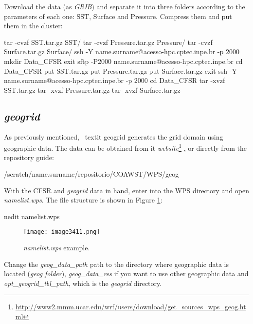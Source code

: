 \noindent Download the data (as \textit{GRIB}) and separate it into three folders according to the parameters of each one:
SST, Surface and Pressure. Compress them and put them in the cluster:
\bigskip

\begin{bashcode}
tar -cvzf SST.tar.gz SST/
tar -cvzf Pressure.tar.gz Pressure/
tar -cvzf Surface.tar.gz Surface/
ssh -Y name.surname@acesso-hpc.cptec.inpe.br -p 2000
mkdir Data_CFSR
exit
sftp -P2000 name.surname@acesso-hpc.cptec.inpe.br
cd Data_CFSR
put SST.tar.gz
put Pressure.tar.gz
put Surface.tar.gz
exit
ssh -Y name.surname@acesso-hpc.cptec.inpe.br -p 2000
cd Data_CFSR
tar -xvzf SST.tar.gz
tar -xvzf Pressure.tar.gz
tar -xvzf Surface.tar.gz
\end{bashcode}
\bigskip

\subsection{\textit{geogrid}}\label{geowps}
\bigskip

\noindent As previously mentioned, \ textit {geogrid} generates the grid domain using geographic data. The data can be obtained from it 
\textcolor{bleu_cite}{\textit{website}\footnote{\textcolor{bleu_cite}{\href{http://www2.mmm.ucar.edu/wrf/users/download/get\_sources\_wps\_geog.html}{http://www2.mmm.ucar.edu/wrf/users/download/get\_sources\_wps\_geog.html}}}}
, or directly from the repository guide:
\bigskip

\begin{bashcode}
/scratch/name.surname/repositorio/COAWST/WPS/geog
\end{bashcode}
\bigskip

\noindent With the CFSR and \textit{geogrid} data in hand, enter into the WPS directory and open \textit{namelist.wps}. 
The file structure is shown in Figure \textcolor{bleu_cite}{\ref{namelistwps}}:
\bigskip

\begin{bashcode}
nedit namelist.wps
\end{bashcode}
\bigskip

\begin{figure}[H]
    \centering
    \texttt{[image: image3411.png]}
    \caption{\textit{namelist.wps} example.}
    \label{namelistwps}
\end{figure}
\bigskip

\noindent Change the \textit{geog\_data\_path} path to the directory where geographic data is located (\textit{geog folder}), 
\textit{geog\_data\_res} if you want to use other geographic data and \textit{opt\_geogrid\_tbl\_path}, which is the 
\textit{geogrid} directory.

